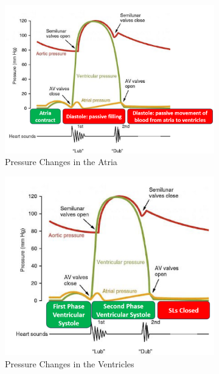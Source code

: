 \documentclass[11pt,fleqn]{book} %
\begin{document}
\begin{figure}[h!]
    \centering
    \begin{subfigure}{0.45\textwidth}
        \includegraphics[width=\textwidth]{Pictures/Screenshot 2024-04-04 003419.png}
        \caption{Pressure Changes in the Atria}
    \end{subfigure}
    \hfill
    \begin{subfigure}{0.45\textwidth}
        \includegraphics[width=\textwidth]{Pictures/Screenshot 2024-04-04 003425.png}
        \caption{Pressure Changes in the Ventricles}
    \end{subfigure}
    \begin{subfigure}{0.45\textwidth}

\end{subfigure}
\end{figure}
\end{document}
